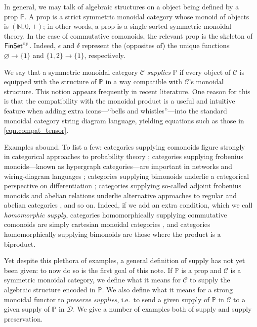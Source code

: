 \documentclass[11pt, oneside, article]{memoir}
\theoremstyle{plain}
\theoremstyle{definition}
\theoremstyle{remark}
\newcommand{\cat}[1]{\mathcal{#1}}%
\newcommand{\Cat}[1]{{\mathsf{#1}}}%
\newcommand{\tn}[1]{\textnormal{#1}}
\newcommand{\op}{^{\tn{op}}}
\newcommand{\finset}{\Cat{FinSet}}
\newcommand{\nn}{\mathbb{N}}
\newcommand{\pp}{\mathbb{P}}
\begin{document}
In general, we may talk of algebraic structures on a object being defined by a prop $\pp$. A prop is a strict symmetric monoidal category whose monoid of objects is $(\nn,0,+)$; in other words, a prop is a single-sorted symmetric monoidal theory. In the case of commutative comonoids, the relevant prop is the skeleton of $\finset\op$. Indeed, $\epsilon$ and $\delta$ represent the (opposites of) the unique functions $\varnothing\to\{1\}$ and $\{1,2\}\to\{1\}$, respectively.

We say that a symmetric monoidal category $\cat{C}$ \emph{supplies} $\pp$ if every object of $\cat{C}$ is equipped with the structure of $\pp$ in a way compatible with $\cat{C}$'s monoidal structure. This notion appears frequently in recent literature. One reason for this is that the compatibility with the monoidal product is a useful and intuitive feature when adding extra icons---``bells and whistles''---into the standard monoidal category string diagram language, yielding equations such as those in \cref{eqn.compat_tensor}.

Examples abound. To list a few: categories supplying comonoids figure strongly in categorical approaches to probability theory \cite{fong2012causal,fritz2019synthetic}; categories supplying frobenius monoids---known as hypergraph categories---are important in networks and wiring-diagram languages \cite{Carboni:1991a,fong2019hypergraph}; categories supplying bimonoids underlie a categorical perspective on differentiation \cite{blute2009cartesian}; categories supplying so-called adjoint frobenius monoids and abelian relations underlie alternative approaches to regular and abelian categories \cite{fong2019abelian}, and so on. Indeed, if we add an extra condition, which we call \emph{homomorphic supply}, categories homomorphically supplying commutative comonoids are simply cartesian monoidal categories \cite{fox1976coalgebras}, and categories homomorphically supplying bimonoids are those where the product is a biproduct.

Yet despite this plethora of examples, a general definition of supply has not yet been given: to now do so is the first goal of this note. If $\pp$ is a prop and $\cat{C}$ is a symmetric monoidal category, we define what it means for $\cat{C}$ to supply the algebraic structure encoded in $\pp$. We also define what it means for a strong monoidal functor to \emph{preserve supplies}, i.e.\ to send a given supply of $\pp$ in $\cat{C}$ to a given supply of $\pp$ in $\cat{D}$. We give a number of examples both of supply and supply preservation.
\end{document}
